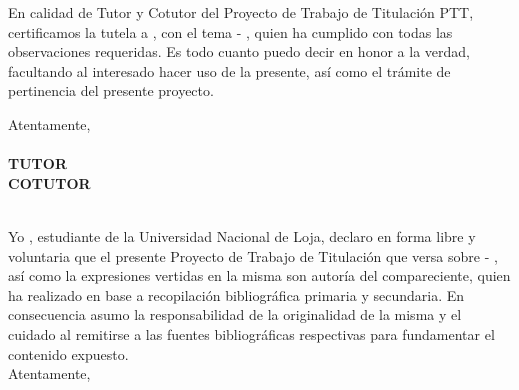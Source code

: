 En calidad de Tutor y Cotutor del Proyecto de Trabajo de Titulación PTT, certificamos la tutela a \miNombre, con el tema \textbf{\titulo} - \textbf{\tituloEng}, quien ha cumplido con todas las observaciones requeridas. Es todo cuanto puedo decir en honor a la verdad, facultando al interesado hacer uso de la presente, así como el trámite de pertinencia del presente proyecto.\\
\linebreak 
\linebreak 
\linebreak
{}
\linebreak
\linebreak
\linebreak
\linebreak
\linebreak
\linebreak
\linebreak
\begin{center}
Atentamente,\\
\miTutor\\
\textbf{TUTOR}
\linebreak 
\linebreak 
\linebreak 
\linebreak 
\linebreak 
\miTutorB\\
\textbf{COTUTOR}
\end{center}


\newpage
{}\\

Yo \miNombre, estudiante de la Universidad Nacional de Loja, declaro en forma libre y voluntaria que el presente Proyecto de Trabajo de Titulación que versa sobre \textbf{\titulo}- \textbf{\tituloEng}, así como la expresiones vertidas en la misma son autoría del compareciente, quien ha realizado en base a recopilación bibliográfica primaria y secundaria. En consecuencia asumo la responsabilidad de la originalidad de la misma y el cuidado al remitirse a las fuentes bibliográficas respectivas para fundamentar el contenido expuesto.\\
\linebreak 
\linebreak 
\linebreak 
\linebreak 
\linebreak 
\linebreak 
Atentamente,\\
\miNombre


